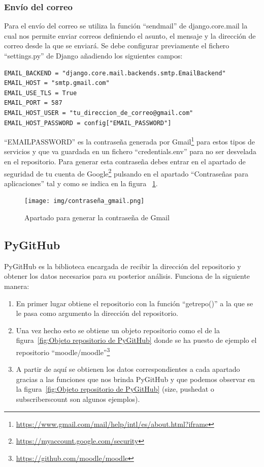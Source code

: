 \documentclass[a4paper, 12pt]{book}
\begin{document}
\subsubsection{Envío del correo}

Para el envío del correo se utiliza la función ``send\textunderscore mail'' de django.core.mail la cual nos permite enviar correos definiendo el asunto, el mensaje y la dirección de correo desde la que se enviará. Se debe configurar previamente el fichero ``settings.py'' de Django añadiendo los siguientes campos:

\begin{verbatim}
EMAIL_BACKEND = "django.core.mail.backends.smtp.EmailBackend"
EMAIL_HOST = "smtp.gmail.com"
EMAIL_USE_TLS = True
EMAIL_PORT = 587
EMAIL_HOST_USER = "tu_direccion_de_correo@gmail.com"
EMAIL_HOST_PASSWORD = config["EMAIL_PASSWORD"]
\end{verbatim}

``EMAIL\textunderscore PASSWORD'' es la contraseña generada por Gmail\footnote{\url{https://www.gmail.com/mail/help/intl/es/about.html?iframe}} para estos tipos de servicios y que va guardada en un fichero ``credentials.env'' para no ser desvelada en el repositorio. Para generar esta contraseña debes entrar en el apartado de seguridad de tu cuenta de Google\footnote{\url{https://myaccount.google.com/security}} pulsando en el apartado ``Contraseñas para aplicaciones'' tal y como se indica en la figura ~\ref{fig:contraseña gmail}.

\begin{figure}
    \centering
    \texttt{[image: img/contraseña\_gmail.png]}
    \caption{Apartado para generar la contraseña de Gmail}\label{fig:contraseña gmail}
\end{figure}

\subsection{PyGitHub}

PyGitHub es la biblioteca encargada de recibir la dirección del repositorio y obtener los datos necesarios para su posterior análisis. Funciona de la siguiente manera:

\begin{enumerate}
	\item En primer lugar obtiene el repositorio con la función ``get\textunderscore repo()'' a la que se le pasa como argumento la dirección del repositorio.
	\item Una vez hecho esto se obtiene un objeto repositorio como el de la figura~\ref{fig:Objeto repositorio de PyGitHub} donde se ha puesto de ejemplo el repositorio ``moodle/moodle''\footnote{\url{https://github.com/moodle/moodle}}
	\item A partir de aquí se obtienen los datos correspondientes a cada apartado gracias a las funciones que nos brinda PyGitHub y que podemos observar en la figura~\ref{fig:Objeto repositorio de PyGitHub} (size, pushed\textunderscore at o subscribers\textunderscore count son algunos ejemplos). 
\end{enumerate}
\end{document}
